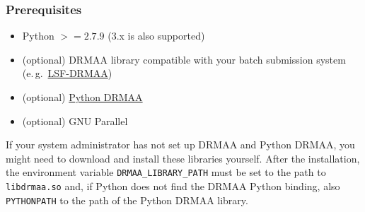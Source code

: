 \documentclass[bibliography=totoc,12pt,a4paper]{scrartcl}
\newcommand{\kwd}[1]{\texttt{#1}}
\begin{document}
\subsubsection{Prerequisites}
\begin{itemize}
 \item Python $>= 2.7.9$ (3.x is also supported)
 \item (optional) DRMAA library compatible with your batch submission system\\
 (e.\,g.\ \href{https://github.com/IBMSpectrumComputing/lsf-drmaa}{LSF-DRMAA})
 \item (optional) \href{https://github.com/drmaa-python/drmaa-python.github.com}{Python DRMAA}
 \item (optional) GNU Parallel
\end{itemize}
 If your system administrator has not set up DRMAA and Python DRMAA, you might need to download and install these libraries yourself. After the installation, the environment variable \kwd{DRMAA\_LIBRARY\_PATH} must be set to the path to \kwd{libdrmaa.so} and, if Python does not find the DRMAA Python binding, also \kwd{PYTHONPATH} to the path of the Python DRMAA library.
\end{document}
